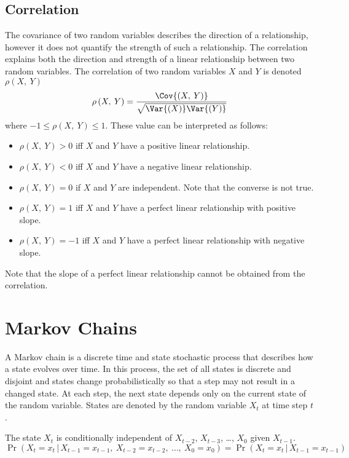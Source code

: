 \documentclass{article}
\begin{document}
\subsection{Correlation}
The covariance of two random variables describes the direction of a
relationship, however it does not quantify the strength of such a
relationship. The correlation explains both the direction and strength
of a linear relationship between two random variables. The correlation
of two random variables \(X\) and \(Y\) is denoted \(\rho\left( X,\: Y
\right)\)
\begin{equation*}
    \rho\left( X,\: Y \right) = \frac{\Cov{\left( X,\: Y \right)}}{\sqrt{\Var{\left( X \right)} \Var{\left( Y \right)}}}
\end{equation*}
where \(-1 \leq \rho\left( X,\: Y \right) \leq 1\).
These value can be interpreted as follows:
\begin{itemize}
    \item \(\rho\left( X,\: Y \right) > 0\) iff \(X\) and \(Y\) have a positive linear relationship.
    \item \(\rho\left( X,\: Y \right) < 0\) iff \(X\) and \(Y\) have a negative linear relationship.
    \item \(\rho\left( X,\: Y \right) = 0\) if \(X\) and \(Y\) are independent. Note that the converse is not true.
    \item \(\rho\left( X,\: Y \right) = 1\) iff \(X\) and \(Y\) have a perfect linear relationship with positive slope.
    \item \(\rho\left( X,\: Y \right) = -1\) iff \(X\) and \(Y\) have a perfect linear relationship with negative slope.
\end{itemize}
Note that the slope of a perfect linear relationship cannot be obtained from the correlation.
\section{Markov Chains}
A Markov chain is a discrete time and state stochastic process that
describes how a state evolves over time. In this process, the set of
all states is discrete and disjoint and states change probabilistically
so that a step may not result in a changed state. At each step, the
next state depends only on the current state of the random variable.
States are denoted by the random variable \(X_t\) at time step \(t\).
\begin{definition}
    The state \(X_t\) is conditionally independent of \(X_{t-2}\), \(X_{t-3}\), \dots, \(X_0\) given \(X_{t-1}\).
    \begin{equation*}
        \Pr{\left( X_t = x_t \,\vert\, X_{t-1} = x_{t-1},\: X_{t-2} = x_{t-2},\: \ldots,\: X_{0} = x_{0} \right)} = \Pr{\left( X_t = x_t \,\vert\, X_{t-1} = x_{t-1} \right)}
    \end{equation*}
\end{definition}
\end{document}
